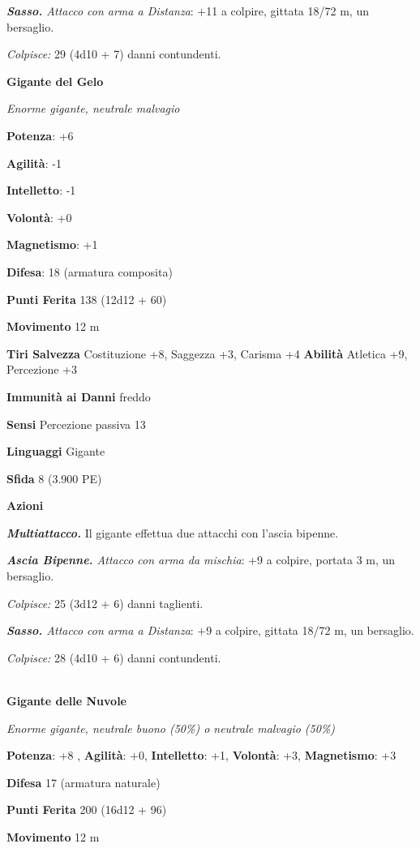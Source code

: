 \begin{multicols}{2}
\emph{\textbf{Sasso.} Attacco con arma a Distanza}: +11 a colpire,
gittata 18/72 m, un bersaglio.

\emph{Colpisce:} 29 (4d10 + 7) danni contundenti.

\textbf{Gigante del Gelo}

\emph{Enorme gigante, neutrale malvagio}

\textbf{Potenza}: +6

\textbf{Agilità}: -1

\textbf{Intelletto}: -1

\textbf{Volontà}: +0

\textbf{Magnetismo}: +1

\textbf{Difesa}: 18 (armatura composita)

\textbf{Punti Ferita} 138 (12d12 + 60)

\textbf{Movimento} 12 m

\textbf{Tiri Salvezza} Costituzione +8, Saggezza +3, Carisma +4
\textbf{Abilità} Atletica +9, Percezione +3

\textbf{Immunità ai Danni} freddo

\textbf{Sensi} Percezione passiva 13

\textbf{Linguaggi} Gigante

\textbf{Sfida} 8 (3.900 PE)

\textbf{Azioni}

\emph{\textbf{Multiattacco.}} Il gigante effettua due attacchi con
l'ascia bipenne.

\emph{\textbf{Ascia Bipenne.} Attacco con arma da mischia}: +9 a
colpire, portata 3 m, un bersaglio.

\emph{Colpisce:} 25 (3d12 + 6) danni taglienti.

\emph{\textbf{Sasso.} Attacco con arma a Distanza}: +9 a colpire,
gittata 18/72 m, un bersaglio.

\emph{Colpisce:} 28 (4d10 + 6) danni contundenti.

\\
\textbf{Gigante delle Nuvole}

\emph{Enorme gigante, neutrale buono (50\%) o neutrale malvagio (50\%)}

\textbf{Potenza}: +8 , \textbf{Agilità}: +0, \textbf{Intelletto}: +1, \textbf{Volontà}: +3, \textbf{Magnetismo}: +3

\textbf{Difesa} 17 (armatura naturale)

\textbf{Punti Ferita} 200 (16d12 + 96)

\textbf{Movimento} 12 m


\end{multicols}
